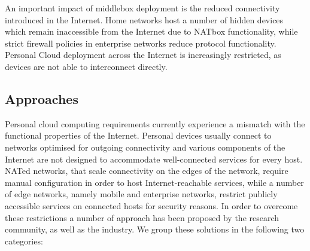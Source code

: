 An important impact of middlebox deployment is the reduced connectivity
introduced in the Internet. Home networks host a number of hidden devices which
remain inaccessible from the Internet due to NATbox functionality, while strict
firewall policies in enterprise networks reduce protocol functionality.
Personal Cloud deployment across the Internet is increasingly restricted, as
devices are not able to interconnect directly.


\subsection{Approaches} \label{sec:sp-approaches}


Personal cloud computing requirements currently experience a mismatch with the
functional properties of the Internet.  Personal devices usually connect to networks
optimised for outgoing connectivity and various components of the
Internet are not designed to accommodate well-connected services for every host.
NATed networks, that scale connectivity on the edges of the network, require
manual configuration in order to host Internet-reachable services, while a
number of edge networks, namely mobile and enterprise networks, restrict
publicly accessible services on connected hosts for security reasons. In order
to overcome these restrictions a number of approach has been proposed by the
research community, as well as the industry.  We group these solutions in the
following two categories:

